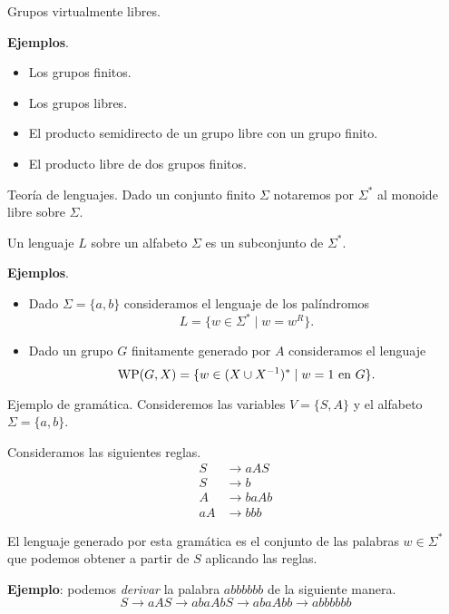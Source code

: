 \documentclass[aspectratio=169, 10pt]{beamer}
\begin{document}
	\begin{frame}[fragile]{Grupos virtualmente libres.}

		\textbf{Ejemplos}.

			\begin{itemize}
				\item Los grupos finitos.
				\item Los grupos libres.
				\item El producto semidirecto de un grupo libre con un grupo finito.
				\item El producto libre de dos grupos finitos.
			\end{itemize}
	\end{frame}

	\begin{frame}[fragile]{Teoría de lenguajes.}
		Dado un conjunto finito $\Sigma$ notaremos por $\Sigma^*$ al monoide libre sobre $\Sigma$.

		Un lenguaje $L$ sobre un alfabeto $\Sigma$ es un subconjunto de $\Sigma^*$.
			
		
			\textbf{Ejemplos}.


			\begin{itemize}
				\item 
					Dado $\Sigma = \{a,b\}$ consideramos el lenguaje de los palíndromos
					\[
						L = \{ w \in \Sigma^{*} \mid w = w^{R}  \}.
					\]
				\item 
					Dado un grupo $G$ finitamente generado por $A$ consideramos el lenguaje
					\[
						\text{WP}(G, X) = \{ w \in (X \cup X^{-1})^{*} \mid w = 1 \ \text{en $G$} \}.	
					\]
			\end{itemize}
	\end{frame}
	
	\begin{frame}[fragile]{Ejemplo de gramática.}
		Consideremos las variables $V =\{ S,A \}$ y el alfabeto $\Sigma = \{ a,b \}$.

		Consideramos las siguientes reglas.
		\begin{align*}
			S  & \to aAS  \\
			S  & \to b    \\
			A  & \to baAb \\
			aA & \to bbb
		\end{align*}

		El lenguaje generado por esta gramática es el conjunto de las palabras $w \in \Sigma^{*}$ que podemos obtener a partir de $S$ aplicando las reglas.

		\textbf{Ejemplo}: podemos \emph{derivar} la palabra $abbbbbb$ de la siguiente manera.  
		\[
			S \to aAS \to abaAbS \to abaAbb \to abbbbbb	
		\]
	\end{frame}
\end{document}
